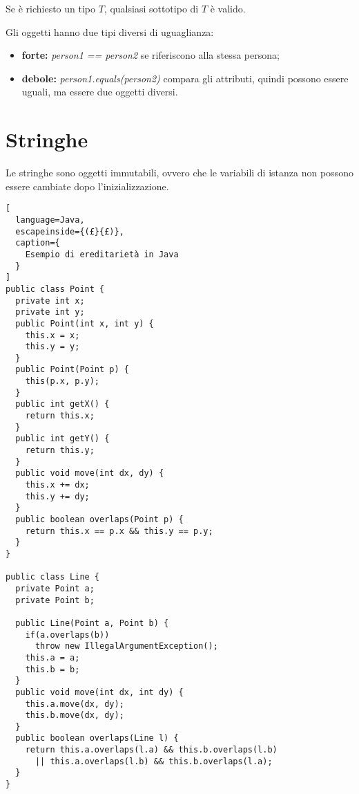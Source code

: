 Se è richiesto un tipo $T$, qualsiasi sottotipo di $T$ è valido.

Gli oggetti hanno due tipi diversi di uguaglianza:
\begin{itemize}
  \item \textbf{forte:} \emph{person1 == person2} se riferiscono alla stessa
    persona;
  \item \textbf{debole:} \emph{person1.equals(person2)} compara gli attributi,
    quindi possono essere uguali, ma essere due oggetti diversi.
\end{itemize}

\section{Stringhe}
Le stringhe sono oggetti immutabili, ovvero che le variabili di istanza non
possono essere cambiate dopo l'inizializzazione.

\begin{lstlisting}[
  language=Java,
  escapeinside={(£}{£)},
  caption={
    Esempio di ereditarietà in Java
  }
]
public class Point {
  private int x;
  private int y;
  public Point(int x, int y) {
    this.x = x;
    this.y = y;
  }
  public Point(Point p) {
    this(p.x, p.y);
  }
  public int getX() {
    return this.x;
  }
  public int getY() {
    return this.y;
  }
  public void move(int dx, dy) {
    this.x += dx;
    this.y += dy;
  }
  public boolean overlaps(Point p) {
    return this.x == p.x && this.y == p.y;
  }
}

public class Line {
  private Point a;
  private Point b;

  public Line(Point a, Point b) {
    if(a.overlaps(b))
      throw new IllegalArgumentException();
    this.a = a;
    this.b = b;
  }
  public void move(int dx, int dy) {
    this.a.move(dx, dy);
    this.b.move(dx, dy);
  }
  public boolean overlaps(Line l) {
    return this.a.overlaps(l.a) && this.b.overlaps(l.b)
      || this.a.overlaps(l.b) && this.b.overlaps(l.a);
  }
}
\end{lstlisting}
